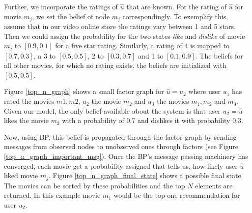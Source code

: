 Further, we incorporate the ratings of $\hat u$ that are known. For the rating of $\hat u$ for movie $m_j$, we set the belief of node $m_j$ correspondingly. To exemplify this, assume that in our video online store the ratings vary between 1 and 5 stars. Then we could assign the probability for the two states \textit{like} and \textit{dislike} of movie $m_j$ to $[0.9,0.1]$ for a five star rating. Similarly, a rating of 4 is mapped to $[0.7,0.3]$, a 3 to $[0.5,0.5]$, 2 to $[0.3,0.7]$ and 1 to $[0.1,0.9]$. The beliefs for all other movies, for which no rating exists, the beliefs are initialized with $[0.5,0.5]$.

Figure \ref{top_n_graph} shows a small factor graph for  $\hat u = u_2$ where user $u_1$ has rated the movies $m1,m2$, $u_2$ the movie $m_2$ and $u_3$ the movies $m_1,m_2$ and $m_3$. Given our model, the only belief available about the system is that user $u_2 = \hat u$ likes the movie $m_2$ with a probability of 0.7 and dislikes it with probability 0.3.

Now, using BP, this belief is propagated through the factor graph by sending messages from observed nodes to unobserved ones through factors (see Figure \ref{top_n_graph_important_msg}). Once the BP's message passing machinery has converged, each movie get a probability assigned that tells us, how likely user $\hat u$ liked movie $m_j$. Figure \ref{top_n_graph_final_state} shows a possible final state. The movies can be sorted by these probabilities and the top $N$ elements are returned. In this example movie $m_1$ would be the top-one recommendation for user $u_2$.

